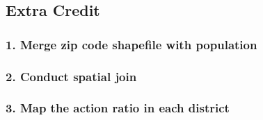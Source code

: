 \documentclass[
  letterpaper,
  DIV=11,
  numbers=noendperiod]{scrartcl}
\begin{document}
\subsection{Extra Credit}\label{extra-credit}

\subsubsection{1. Merge zip code shapefile with
population}\label{merge-zip-code-shapefile-with-population}

\subsubsection{2. Conduct spatial join}\label{conduct-spatial-join}

\subsubsection{3. Map the action ratio in each
district}\label{map-the-action-ratio-in-each-district}
\end{document}
